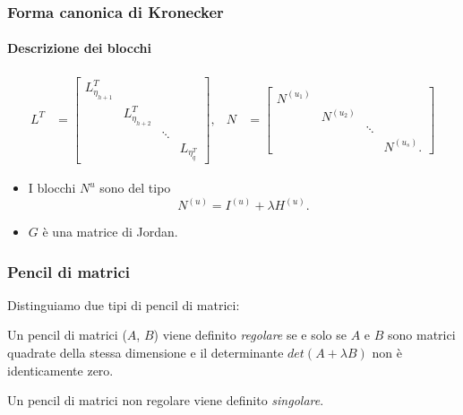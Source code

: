 \begin{frame}
	\frametitle{Forma canonica di Kronecker}
	\framesubtitle{Descrizione dei blocchi}
	\begin{align*}
		L^T &= \left[\begin{smallmatrix}
			L_{\eta_{h+1}}^T \\
			& L_{\eta_{h+2}}^T \\
			& & \ddots \\
			& & & L_{\eta_{q}^T}
		\end{smallmatrix}\right], &
		N &= \left[\begin{smallmatrix}
			N^{(u_{1})} \\
			& N^{(u_{2})} \\ 
			& & \ddots \\
			& & & N^{(u_{s})}.
		\end{smallmatrix}\right]
	\end{align*}
	\begin{itemize}
		\item {} I blocchi $N^{u}$ sono del tipo
		\[N^{(u)} = I^{(u)} + \lambda H^{(u)}.\]
		\item {} $G$ \`e una matrice di Jordan.
	\end{itemize}
\end{frame}


\begin{frame}
	\frametitle{Pencil di matrici}
	Distinguiamo due tipi di pencil di matrici:
	\begin{definition}
		Un pencil di matrici ($A$, $B$) viene definito \emph{regolare} se e solo se
		$A$ e $B$ sono matrici quadrate della stessa dimensione e il determinante
		$det(A+\lambda B)$ non \`e identicamente zero.
	\end{definition}
	\begin{definition}
			Un pencil di matrici non regolare viene definito \emph{singolare}.
	\end{definition}
\end{frame}